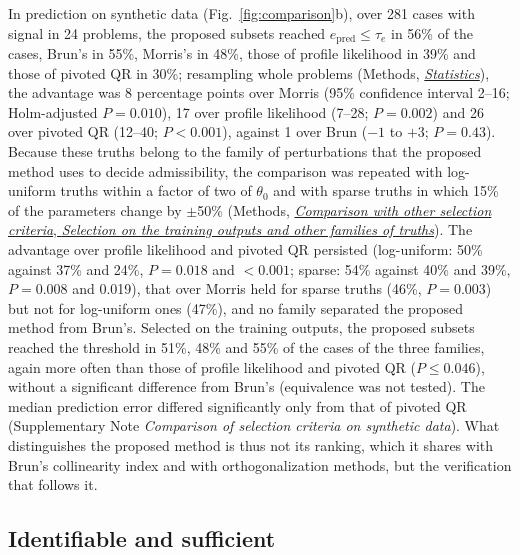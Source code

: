 \documentclass[pdflatex,sn-nature]{sn-jnl}
\theoremstyle{plain}
\newcommand{\mref}[2]{\hyperref[#1]{#2}}
\begin{document}
In prediction on synthetic data (Fig.~\ref{fig:comparison}b), over 281 cases with signal in 24 problems, the proposed subsets reached $e_{\mathrm{pred}}\le\tau_e$ in 56\% of the cases, Brun's in 55\%, Morris's in 48\%, those of profile likelihood in 39\% and those of pivoted QR in 30\%; resampling whole problems (Methods, \mref{met:stats}{\emph{Statistics}}), the advantage was 8 percentage points over Morris (95\% confidence interval 2--16; Holm-adjusted $P=0.010$), 17 over profile likelihood (7--28; $P=0.002$) and 26 over pivoted QR (12--40; $P<0.001$), against 1 over Brun ($-1$ to $+3$; $P=0.43$). Because these truths belong to the family of perturbations that the proposed method uses to decide admissibility, the comparison was repeated with log-uniform truths within a factor of two of $\theta_0$ and with sparse truths in which 15\% of the parameters change by $\pm$50\% (Methods, \mref{met:comp-train}{\emph{Comparison with other selection criteria}, \emph{Selection on the training outputs and other families of truths}}). The advantage over profile likelihood and pivoted QR persisted (log-uniform: 50\% against 37\% and 24\%, $P=0.018$ and $<0.001$; sparse: 54\% against 40\% and 39\%, $P=0.008$ and 0.019), that over Morris held for sparse truths (46\%, $P=0.003$) but not for log-uniform ones (47\%), and no family separated the proposed method from Brun's. Selected on the training outputs, the proposed subsets reached the threshold in 51\%, 48\% and 55\% of the cases of the three families, again more often than those of profile likelihood and pivoted QR ($P\le0.046$), without a significant difference from Brun's (equivalence was not tested). The median prediction error differed significantly only from that of pivoted QR (Supplementary Note \textit{Comparison of selection criteria on synthetic data}). What distinguishes the proposed method is thus not its ranking, which it shares with Brun's collinearity index and with orthogonalization methods\cite{bib43,bib45}, but the verification that follows it.



\subsection*{Identifiable and sufficient}\label{sec:identcrit}
\end{document}
